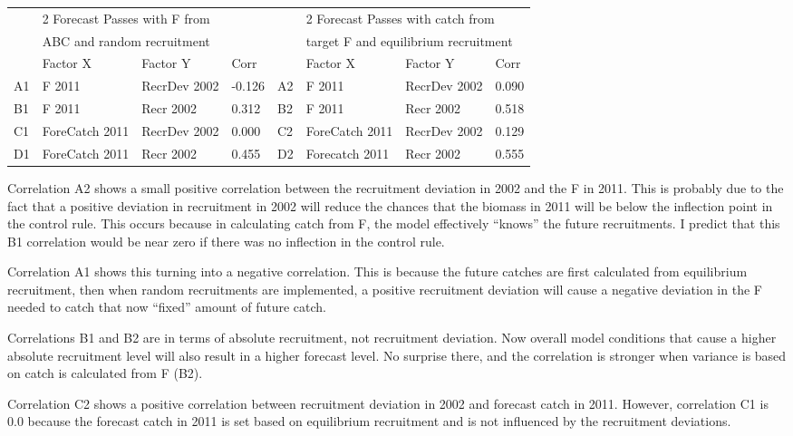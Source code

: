 \begin{center}
	\begin{longtable}{p{0.4cm} p{2.75cm} p{3cm} p{1cm} p{0.4cm} p{2.75cm} p{2cm} p{1cm}}
		\hline
		 & \multicolumn{3}{l}{2 Forecast Passes with F from} & & \multicolumn{3}{l}{2 Forecast Passes with catch from} \\
		 & \multicolumn{3}{l}{ABC and random recruitment} & & \multicolumn{3}{l}{target F and equilibrium recruitment} \\
		\hline
		 & Factor X & Factor Y & Corr & & Factor X & Factor Y & Corr \\
		\hline
		A1 & F 2011 & RecrDev 2002 & -0.126 & A2 & F 2011 & RecrDev 2002 & 0.090 \\
		B1 & F 2011 & Recr 2002 & 0.312 & B2 & F 2011 & Recr 2002 & 0.518 \\
		C1 & ForeCatch 2011 & RecrDev 2002 & 0.000 & C2 & ForeCatch 2011 & RecrDev 2002 & 0.129 \\
		D1 & ForeCatch 2011 & Recr 2002 & 0.455 & D2 & Forecatch 2011 & Recr 2002 & 0.555 \\
		\hline		
	\end{longtable}
\end{center}

Correlation A2 shows a small positive correlation between the recruitment deviation in 2002 and the F in 2011. This is probably due to the fact that a positive deviation in recruitment in 2002 will reduce the chances that the biomass in 2011 will be below the inflection point in the control rule. This occurs because in calculating catch from F, the model effectively ``knows'' the future recruitments. I predict that this B1 correlation would be near zero if there was no inflection in the control rule.

Correlation A1 shows this turning into a negative correlation. This is because the future catches are first calculated from equilibrium recruitment, then when random recruitments are implemented, a positive recruitment deviation will cause a negative deviation in the F needed to catch that now ``fixed'' amount of future catch.

Correlations B1 and B2 are in terms of absolute recruitment, not recruitment deviation. Now overall model conditions that cause a higher absolute recruitment level will also result in a higher forecast level. No surprise there, and the correlation is stronger when variance is based on catch is calculated from F (B2).

Correlation C2 shows a positive correlation between recruitment deviation in 2002 and forecast catch in 2011. However, correlation C1 is 0.0 because the forecast catch in 2011 is set based on equilibrium recruitment and is not influenced by the recruitment deviations.

